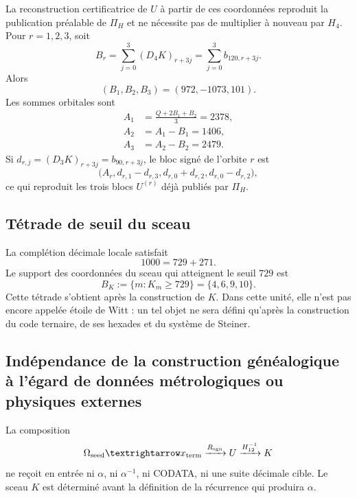 La reconstruction certificatrice de \(U\) à partir de ces coordonnées reproduit la
publication préalable de \(\Pi_H\) et ne nécessite pas de multiplier à nouveau par
\(H_4\). Pour \(r=1,2,3\), soit
\begin{equation}
 B_r=\sum_{j=0}^{3}(D_4K)_{r+3j}
 =\sum_{j=0}^{3}b_{120,r+3j}.
 \label{p12-83-c10-s1:eq:br-diferencias-k}
\end{equation}
Alors
\[
 (B_1,B_2,B_3)=(972,-1073,101).
\]
Les sommes orbitales sont
\begin{align}
 A_1&=\frac{Q+2B_1+B_2}{3}=2378,
 \label{p12-83-c10-s1:eq:a1-reconstruccion-u}\\
 A_2&=A_1-B_1=1406,
 \label{p12-83-c10-s1:eq:a2-reconstruccion-u}\\
 A_3&=A_2-B_2=2479.
 \label{p12-83-c10-s1:eq:a3-reconstruccion-u}
\end{align}
Si \(d_{r,j}=(D_3K)_{r+3j}=b_{90,r+3j}\), le bloc signé de l’orbite
\(r\) est
\begin{equation}
 \bigl(A_r,
 d_{r,1}-d_{r,3},
 d_{r,0}+d_{r,2},
 d_{r,0}-d_{r,2}\bigr),
 \label{p12-83-c10-s1:eq:bloque-firmado-desde-diferencias}
\end{equation}
ce qui reproduit les trois blocs \(U^{(r)}\) déjà publiés par \(\Pi_H\).

\subsection{Tétrade de seuil du sceau}

La complétion décimale locale satisfait
\[
 1000=729+271.
\]
Le support des coordonnées du sceau qui atteignent le seuil \(729\) est
\begin{equation}
 \boxed{
 B_K:=\{m:K_m\geq729\}=\{4,6,9,10\}.}
 \label{p12-83-c10-s1:eq:tetrada-umbral-k}
\end{equation}
Cette tétrade s’obtient après la construction de \(K\). Dans cette unité, elle n’est pas
encore appelée étoile de Witt : un tel objet ne sera défini qu’après
la construction du code ternaire, de ses hexades et du système de Steiner.

\subsection{Indépendance de la construction généalogique à l'égard de données métrologiques ou physiques externes}

\begin{theorem}[Isolement de \(U\) et \(K\)]
\label{p12-83-c10-s1:thm:aislamiento-u-k-alpha-codata}
La composition
\begin{equation}
 \Omega_{\rm seed}\longrightarrow x_{\rm term}
 \xrightarrow{R_{\rm sgn}}U
 \xrightarrow{\mathcal H_{12}^{-1}}K
 \label{p12-83-c10-s1:eq:composicion-upstream-u-k}
\end{equation}
ne reçoit en entrée ni \(\alpha\), ni \(\alpha^{-1}\), ni CODATA, ni une suite
décimale cible. Le sceau \(K\) est déterminé avant la définition de la
récurrence qui produira \(\alpha\).
\end{theorem}

